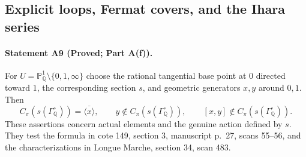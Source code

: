 \subsection{Explicit loops, Fermat covers, and the Ihara series}
\paragraph{Statement A9 (Proved; Part A(f)).}\label{res:A9}
For $U=\mathbb P^1_{\mathbb Q}\setminus\{0,1,\infty\}$ choose the rational tangential base point at $0$ directed toward $1$, the corresponding section $s$, and geometric generators $x,y$ around $0,1$. Then
\[
 C_\pi(s(\Gamma_{\mathbb Q}^{\circ}))=\overline{\langle x\rangle},
 \qquad y\notin C_\pi(s(\Gamma_{\mathbb Q}^{\circ})),
 \qquad [x,y]\notin C_\pi(s(\Gamma_{\mathbb Q}^{\circ})).
\]
These assertions concern actual elements and the genuine action defined by $s$. They test the formula in cote 149, section 3, manuscript p.~27, scans 55--56, and the characterizations in Longue Marche, section 34, scan 483.

